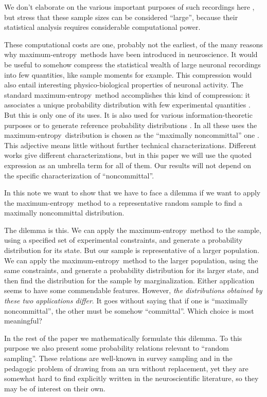 \documentclass{article}
\theoremstyle{remark}
\theoremstyle{innote}
\newcommand*{\citep}{\parencites}
\renewcommand*{\cite}{\citep}
\renewcommand*{\|}{\mathpunct{|}}%
\theoremstyle{simple}
\newcommand*{\me}{maximum-entropy}
\begin{document}
We don't elaborate on the various important purposes of such recordings
here \cite{?***}, but stress that these sample sizes can be considered
\enquote{large}, because their statistical analysis requires considerable
computational power.

These computational costs are one, probably not the earliest, of the many
reasons why \me\ methods have been introduced in neuroscience. It would be
useful to somehow compress the statistical wealth of large neuronal
recordings into few quantities, like sample moments for example. This
compression would also entail interesting physico-biological properties of
neuronal activity. The standard \me\ method
\cite{jaynes1957,sivia1996_r2006,meadetal1984} accomplishes this kind of
compression: it associates a unique probability distribution with few
experimental quantities \cite{***}. But this is only one of its uses. It is
also used for various information-theoretic purposes or to generate
reference probability distributions \cite{***}. In all these uses the \me\
distribution is chosen as the \enquote{maximally noncommittal} one
\cite{jaynes1963}. This adjective means little without further technical
characterizations. Different works give different characterizations, but in
this paper we will use the quoted expression as an umbrella term for all of
them. Our results will not depend on the specific characterization of
\enquote{noncommittal}.

\bigskip

In this note we want to show that we have to face a dilemma if we want to
apply the \me\ method to a representative random sample to find a maximally
noncommittal distribution.

The dilemma is this. We can apply the \me\ method to the sample, using a
specified set of experimental constraints, and generate a probability
distribution for its state. But our sample is representative of a larger
population. We can apply the \me\ method to the larger population, using
the same constraints, and generate a probability distribution for its
larger state, and then find the distribution for the sample by
marginalization. Either application seems to have some commendable
features. However, \emph{the distributions obtained by these two
  applications differ}. It goes without saying that if one is
\enquote{maximally noncommittal}, the other must be somehow
\enquote{committal}. Which choice is most meaningful?


In the rest of the paper we mathematically formulate this dilemma. To this
purpose we also present some probability relations relevant to
\enquote{random sampling}. These relations are well-known in survey
sampling and in the pedagogic problem of drawing from an urn without
replacement, yet they are somewhat hard to find explicitly written in the
neuroscientific literature, so they may be of interest on their own. 
\end{document}
